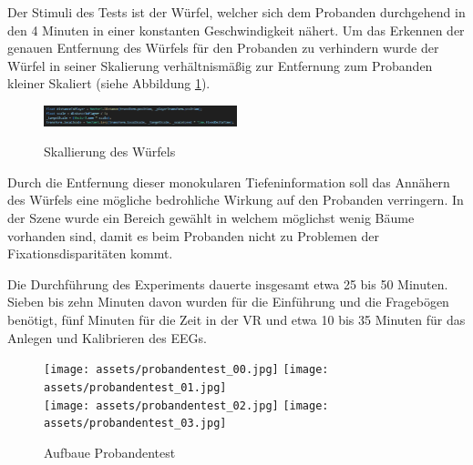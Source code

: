 \documentclass[conference]{IEEEtran}
\begin{document}
Der Stimuli des Tests ist der Würfel, welcher sich dem Probanden durchgehend in den 4 Minuten in einer konstanten Geschwindigkeit nähert. Um das Erkennen der genauen Entfernung des Würfels für den Probanden zu verhindern wurde der Würfel in seiner Skalierung verhältnismäßig zur Entfernung zum Probanden kleiner Skaliert (siehe Abbildung \ref{fig:scale_cube}). 
\begin{figure}[ht]
	\centering
	\includegraphics[width=0.5\textwidth]{assets/Scalling.jpg} \\
	\caption{Skallierung des Würfels}
	\label{fig:scale_cube}
\end{figure}
Durch die Entfernung dieser monokularen Tiefeninformation soll das Annähern des Würfels eine mögliche bedrohliche Wirkung auf den Probanden verringern. In der Szene wurde ein Bereich gewählt in welchem möglichst wenig Bäume  vorhanden sind, damit es beim Probanden nicht zu Problemen der Fixationsdisparitäten kommt.

Die Durchführung des Experiments dauerte insgesamt etwa 25 bis 50 Minuten. Sieben bis zehn Minuten davon wurden für die Einführung und die Fragebögen benötigt, fünf Minuten für die Zeit in der VR und etwa 10 bis 35 Minuten für das Anlegen und Kalibrieren des EEGs. 

\begin{figure}[ht]
	\centering
	\texttt{[image: assets/probandentest\_00.jpg]} \hspace{-5pt}
	\texttt{[image: assets/probandentest\_01.jpg]} \\
	\vspace{2pt}
	\texttt{[image: assets/probandentest\_02.jpg]} \hspace{-5pt}
	\texttt{[image: assets/probandentest\_03.jpg]} \hspace{-5pt}
	\caption{Aufbaue Probandentest}
	\label{fig:structure_probandentest}
\end{figure}
\end{document}

